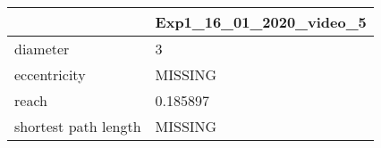 \begin{tabular}{ll}
\toprule
{} & Exp1\_16\_01\_2020\_video\_5 \\
\midrule
diameter             &                       3 \\
eccentricity         &                 MISSING \\
reach                &                0.185897 \\
shortest path length &                 MISSING \\
\bottomrule
\end{tabular}

